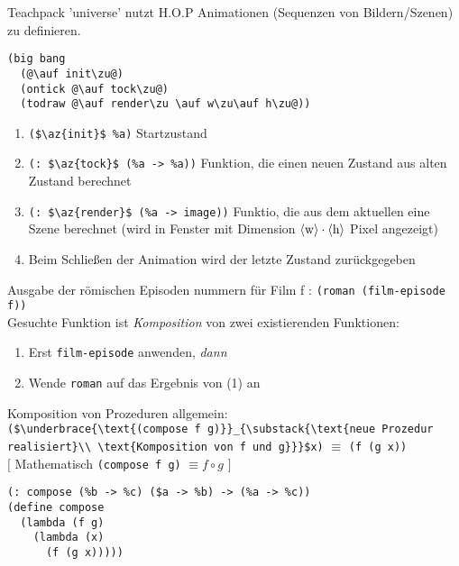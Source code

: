 
Teachpack 'universe' nutzt H.O.P Animationen (Sequenzen von Bildern/Szenen) zu definieren.
\begin{lstlisting}
(big bang
  (@\auf init\zu@)
  (ontick @\auf tock\zu@)
  (todraw @\auf render\zu \auf w\zu\auf h\zu@))
\end{lstlisting}
\begin{enumerate}[-]
\item \lstinline[mathescape]|($\az{init}$ %a)| Startzustand
\item \lstinline[mathescape]|(: $\az{tock}$ (%a -> %a))|
Funktion, die einen neuen Zustand aus alten Zustand berechnet
\item \lstinline[mathescape]|(: $\az{render}$ (%a -> image))| Funktio, die aus dem aktuellen eine Szene berechnet (wird in Fenster mit Dimension $\langle \text{w}\rangle \cdot \langle \text{h}\rangle$ Pixel angezeigt)
\item Beim Schlie\ss en der Animation wird der letzte Zustand zurückgegeben
\end{enumerate}
Ausgabe der römischen Episoden nummern für Film f : \lstinline|(roman (film-episode f))|\\
Gesuchte Funktion ist \emph{Komposition} von zwei existierenden Funktionen:
\begin{enumerate}[(1)]
\item Erst \lstinline[mathescape]|film-episode| anwenden, \emph{dann}
\item Wende \lstinline[mathescape]|roman| auf das Ergebnis von (1) an
\end{enumerate}
Komposition von Prozeduren allgemein:\\
\lstinline[mathescape]|($\underbrace{\text{(compose f g)}}_{\substack{\text{neue Prozedur realisiert}\\ \text{Komposition von f und g}}}$x)| $\equiv$ \lstinline|(f (g x))|\\
$\lbrack$ Mathematisch \lstinline|(compose f g)| $\equiv f \circ g$ $\rbrack$\\
\begin{lstlisting}
(: compose (%b -> %c) ($a -> %b) -> (%a -> %c))
(define compose
  (lambda (f g)
    (lambda (x)
      (f (g x)))))
\end{lstlisting}
